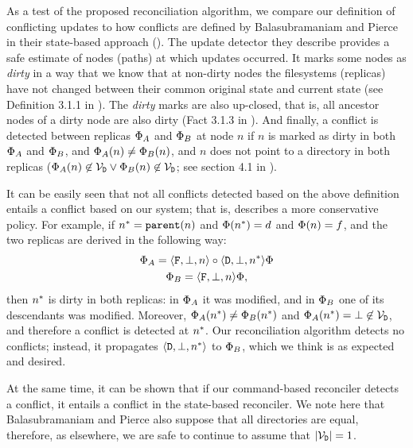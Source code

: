 As a test of the proposed reconciliation algorithm, 
we compare our definition of conflicting
updates to how conflicts are defined by Balasubramaniam and Pierce
in their state-based approach (\cite{BP}).
The update detector they describe provides a safe estimate of nodes
(paths) at which updates occurred.
It marks some nodes as \emph{dirty} in a way that we know that at non-dirty nodes
the filesystems (replicas) have not changed between their common original state and current state
(see Definition 3.1.1 in \cite{BP}).
The \emph{dirty} marks are also up-closed, that is, all ancestor nodes of a dirty node
are also dirty (Fact 3.1.3 in \cite{BP}).
And finally, a conflict is detected between replicas $\Phi_A$ and $\Phi_B$ at node $n$
if $n$ is marked as dirty in both $\Phi_A$ and $\Phi_B$, and
$\Phi_A(n)\neq\Phi_B(n)$, and $n$ does not point to a directory in both replicas
($\Phi_A(n)\not\in\mathcal{V}_{\mathtt{D}} \vee \Phi_B(n)\not\in\mathcal{V}_{\mathtt{D}}$; see section 4.1 in \cite{BP}).

It can be easily seen that not all conflicts detected based on the above definition
entails a conflict based on our system; that is, \cite{BP} describes a more
conservative policy.
For example, if $n^*=\mathtt{parent}(n)$ and $\Phi(n^*)=d$ and $\Phi(n)=f$, and
the two replicas are derived in the following way:
\begin{gather*}
\Phi_A = \langle{\mathtt{F},\bot,n}\rangle \circ \langle{\mathtt{D},\bot,n^*}\rangle \Phi \\
\Phi_B = \langle{\mathtt{F},\bot,n}\rangle \Phi,
\end{gather*}
then $n^*$ is dirty in both replicas:
in $\Phi_A$ it was modified, and in $\Phi_B$ one of its descendants was modified.
Moreover, $\Phi_A(n^*)\neq\Phi_B(n^*)$ and $\Phi_A(n^*)=\bot\not\in\mathcal{V}_{\mathtt{D}}$,
and therefore a conflict is detected at $n^*$.
Our reconciliation algorithm detects no conflicts;
instead, it propagates $\langle{\mathtt{D},\bot,n^*}\rangle$ to $\Phi_B$, which we think is as expected
and desired.

At the same time, it can be shown that if our command-based reconciler
detects a conflict, it entails a conflict in the state-based reconciler.
We note here that Balasubramaniam and Pierce also suppose that all directories are equal,
therefore, as elsewhere, we are safe to continue to assume that $|\mathcal{V}_{\mathtt{D}}|=1$.

